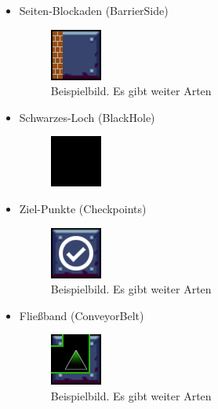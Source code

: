 \documentclass[12pt,a4paper,oneside]{book}
\theoremstyle{plain}
\numberwithin{equation}{chapter} \DeclareMathOperator{\Var}{Var}
\begin{document}
\begin{itemize}
    \item Seiten-Blockaden (BarrierSide)
    \begin{itemize}
        \begin{figure}[h]
            \centering
            \includegraphics{assets/BarrierSide/BarrierSide1.png}
            \caption*{Beispielbild. Es gibt weiter Arten}
            \label{BarrierSideFeld}
        \end{figure}
    \end{itemize}
    
    \item Schwarzes-Loch (BlackHole)
    \begin{itemize}
        \begin{figure}[h]
            \centering
            \includegraphics{assets/BlackHole/BlackHole.png}
            \label{BlackHoleFeld}
        \end{figure}
    \end{itemize}
    
    \newpage
    \item Ziel-Punkte (Checkpoints)
    \begin{itemize}
        \begin{figure}[h]
            \centering
            \includegraphics{assets/Checkpoints/Check1.png}
            \caption*{Beispielbild. Es gibt weiter Arten}
            \label{CheckpointFeld}
        \end{figure}
    \end{itemize}
    
    \item Fließband (ConveyorBelt)
    \begin{itemize}
        \begin{figure}[h]
            \centering
            \includegraphics{assets/ConveyorBelt/ConveyorBelt12.png}
            \caption*{Beispielbild. Es gibt weiter Arten}
            \label{ConveyorBelt}
        \end{figure}
    \end{itemize}
    

\end{itemize}
\end{document}
